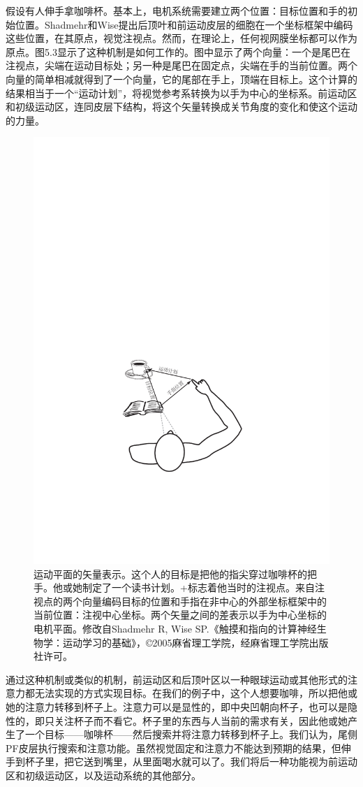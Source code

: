 假设有人伸手拿咖啡杯。基本上，电机系统需要建立两个位置：目标位置和手的初始位置。Shadmehr和Wise提出后顶叶和前运动皮层的细胞在一个坐标框架中编码这些位置，在其原点，视觉注视点。然而，在理论上，任何视网膜坐标都可以作为原点。图5.3显示了这种机制是如何工作的。图中显示了两个向量：一个是尾巴在注视点，尖端在运动目标处；另一种是尾巴在固定点，尖端在手的当前位置。两个向量的简单相减就得到了一个向量，它的尾部在手上，顶端在目标上。这个计算的结果相当于一个“运动计划”，将视觉参考系转换为以手为中心的坐标系。前运动区和初级运动区，连同皮层下结构，将这个矢量转换成关节角度的变化和使这个运动的力量。
\begin{figure}
	\centering
	\includegraphics[width=0.7\linewidth]{image_pfc/Fig_5_3}
	\caption{运动平面的矢量表示。这个人的目标是把他的指尖穿过咖啡杯的把手。他或她制定了一个读书计划。+标志着他当时的注视点。来自注视点的两个向量编码目标的位置和手指在非中心的外部坐标框架中的当前位置：注视中心坐标。两个矢量之间的差表示以手为中心坐标的电机平面。修改自Shadmehr R, Wise SP.《触摸和指向的计算神经生物学：运动学习的基础》，©2005麻省理工学院，经麻省理工学院出版社许可。}
	\label{fig:fig}
\end{figure}
通过这种机制或类似的机制，前运动区和后顶叶区以一种眼球运动或其他形式的注意力都无法实现的方式实现目标。在我们的例子中，这个人想要咖啡，所以把他或她的注意力转移到杯子上。注意力可以是显性的，即中央凹朝向杯子，也可以是隐性的，即只关注杯子而不看它。杯子里的东西与人当前的需求有关，因此他或她产生了一个目标——咖啡杯——然后搜索并将注意力转移到杯子上。我们认为，尾侧PF皮层执行搜索和注意功能。虽然视觉固定和注意力不能达到预期的结果，但伸手到杯子里，把它送到嘴里，从里面喝水就可以了。我们将后一种功能视为前运动区和初级运动区，以及运动系统的其他部分。

